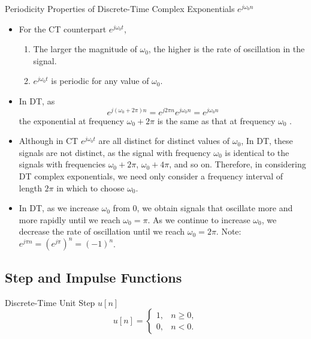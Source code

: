 \begin{frame}{Periodicity Properties of Discrete-Time Complex Exponentials $e^{j\omega_0 n}$}
    \begin{itemize}[<+-| alert@+>]
      \item For the CT counterpart  $e^{j\omega_0 t}$,
        \begin{enumerate}
            \item The larger the magnitude of $\omega_0$, the higher is the rate of oscillation in the signal.
            \item $e^{j\omega_0 t}$ is periodic for any value of $\omega_0$.
        \end{enumerate}
      \item In DT, as
        \begin{equation*}
            e^{j(\omega_0 + 2\pi)n} = e^{j2\pi n}e^{j\omega_0n} = e^{j\omega_0n}
        \end{equation*}
        the exponential at frequency $\omega_0 + 2\pi$ is the same as that at frequency $\omega_0$ .
      \item Although in CT  $e^{j\omega_0 t}$ are all distinct for distinct values of $\omega_0$, In DT, these signals are not distinct, as the signal with frequency $\omega_0$ is identical to the signals with frequencies $\omega_0 + 2\pi$, $\omega_0 + 4\pi$, and so on. Therefore, in considering DT complex exponentials, we need only consider a frequency interval of length $2\pi$ in which to choose $\omega_0$.
      \item In DT, as we increase $\omega_0$ from 0, we obtain signals that oscillate more and more rapidly until we reach $\omega_0 = \pi$. As we continue to increase $\omega_0$, we decrease the rate of oscillation until we reach $\omega_0 = 2\pi$. Note: $e^{j\pi n} = \left(e^{j\pi}\right)^n = (-1)^n$.
    \end{itemize}

\end{frame}

\subsection{Step and Impulse Functions}
\begin{frame}[plain]{Discrete-Time Unit Step  $u[n]$}
    \begin{equation}
        u[n] = \begin{cases}
                 1, & n \geq 0,\\
                 0, & n<0.
               \end{cases}
    \end{equation}
    {
        {
            \centering
            
        }
    }
\end{frame}

